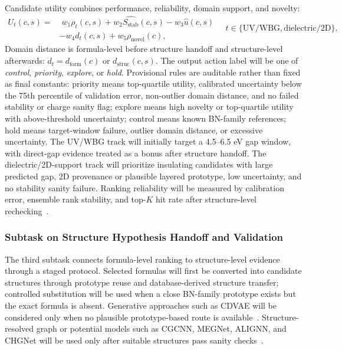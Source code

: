 \documentclass[12pt,a4paper]{article}
\newcommand{\unc}{u}
\newcommand{\stab}{S_{\mathrm{stab}}}
\newcommand{\domainf}{d_{\mathrm{form}}}
\newcommand{\domains}{d_{\mathrm{struc}}}
\newcommand{\utility}{U}
\newcommand{\novel}{\rho_{\mathrm{novel}}}
\begin{document}
Candidate utility combines performance, reliability, domain support, and novelty:
\begin{equation}
  \begin{aligned}
  \utility_t(c,s)=&\;w_1\rho_t(c,s)+w_2\hat{\stab}(c,s)-w_3\hat{\unc}(c,s)\\
  &-w_4 d_t(c,s)+w_5\novel(c),
  \end{aligned}
  \quad t\in\{\mathrm{UV/WBG},\mathrm{dielectric/2D}\}.
\end{equation}
Domain distance is formula-level before structure handoff and structure-level afterwards: $d_t=\domainf(c)$ or $\domains(c,s)$. The output action label will be one of \textit{control}, \textit{priority}, \textit{explore}, or \textit{hold}. Provisional rules are auditable rather than fixed as final constants: priority means top-quartile utility, calibrated uncertainty below the 75th percentile of validation error, non-outlier domain distance, and no failed stability or charge sanity flag; explore means high novelty or top-quartile utility with above-threshold uncertainty; control means known BN-family references; hold means target-window failure, outlier domain distance, or excessive uncertainty. The UV/WBG track will initially target a 4.5--6.5 eV gap window, with direct-gap evidence treated as a bonus after structure handoff. The dielectric/2D-support track will prioritize insulating candidates with large predicted gap, 2D provenance or plausible layered prototype, low uncertainty, and no stability sanity failure. Ranking reliability will be measured by calibration error, ensemble rank stability, and top-$K$ hit rate after structure-level rechecking~\cite{lookman2019_active}.

\vspace{-10pt}
\subsubsection{Subtask on Structure Hypothesis Handoff and Validation}
\label{subsubsec:structure-validation}
\vspace{-5pt}
The third subtask connects formula-level ranking to structure-level evidence through a staged protocol. Selected formulas will first be converted into candidate structures through prototype reuse and database-derived structure transfer; controlled substitution will be used when a close BN-family prototype exists but the exact formula is absent. Generative approaches such as CDVAE will be considered only when no plausible prototype-based route is available~\cite{xie2022_cdvae}. Structure-resolved graph or potential models such as CGCNN, MEGNet, ALIGNN, and CHGNet will be used only after suitable structures pass sanity checks~\cite{xie2018_cgcnn,chen2019_megnet,choudhary2021_alignn,deng2023_chgnet}.
\end{document}
